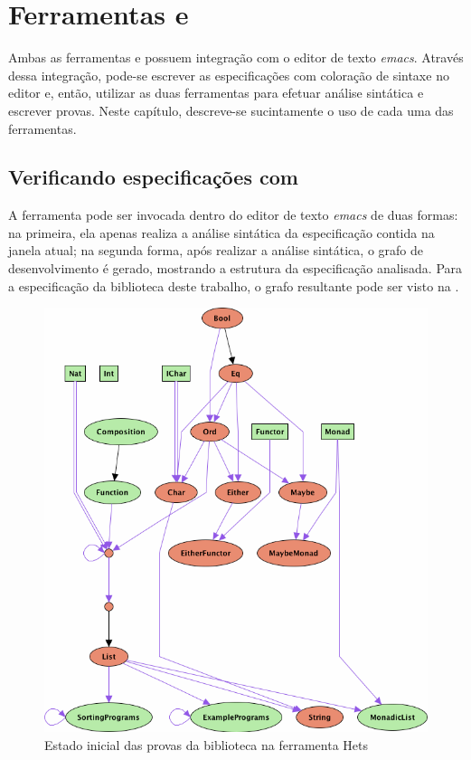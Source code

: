 \chapter{Ferramentas \Hets e \Isabelle}
\label{chap:hetseisabelle}

Ambas as ferramentas \Hets e \Isabelle possuem integração com o editor de texto \textit{emacs}.
Através dessa integração, pode-se escrever as especificações com coloração de sintaxe no editor e, então, utilizar as duas ferramentas para efetuar análise sintática e escrever provas.
Neste capítulo, descreve-se sucintamente o uso de cada uma das ferramentas.

\section{Verificando especificações com \Hets}
A ferramenta \Hets pode ser invocada dentro do editor de texto \textit{emacs} de duas formas: na primeira, ela apenas realiza a análise sintática da especificação contida na janela atual; na segunda forma, após realizar a análise sintática, o grafo de desenvolvimento é gerado, mostrando a estrutura da especificação analisada. Para a especificação da biblioteca deste trabalho, o grafo resultante pode ser visto na .

\begin{figure}[hp]
	\centering
		\includegraphics[scale=0.7]{"figuras/ProofStart.png"}
	\caption{Estado inicial das provas da biblioteca na ferramenta Hets}
	\label{fig:ProofStart}
\end{figure}

